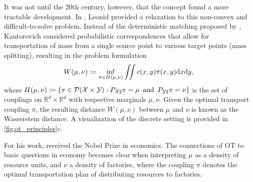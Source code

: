It was not until the 20th century, however, that the concept found a more tractable development. In \citeyear{kantorovich1942transfer}, Leonid \citeauthor{kantorovich1942transfer} provided a relaxation to this non-convex and difficult-to-solve problem.
Instead of the deterministic matching proposed by \citeauthor{monge1781histoire}, Kantorovich considered probabilistic correspondences that allow for transportation of mass from a single source point to various target points (mass splitting), resulting in the problem formulation
\begin{equation} \label{eq:kantorovich}
    W(\mu, \nu) \coloneqq \inf_{\pi\in \Pi(\mu,\nu)}\iint c(x, y) \pi(x, y)\mathrm{d}x\mathrm{d}y,
\end{equation}
where $\Pi(\mu, \nu) \coloneqq \left\{\pi \in {\mathcal{P}}(\mathcal{X} \times \mathcal{Y}): P_{{\mathcal{X}} \sharp} \pi=\mu \, \text { and } \, P_{{\mathcal{Y}} \sharp} \pi=\nu\right\}$ is the set of couplings on $\mathbb{R}^d\times\mathbb{R}^d$ with respective marginals $\mu, \nu$. Given the optimal transport coupling $\pi$, the resulting distance $W(\mu, \nu)$ between $\mu$ and $\nu$ is known as the Wasserstein distance.
A visualization of the discrete setting is provided in \cref{fig:ot_principles}c.

For his work, \citeauthor{kantorovich1942transfer} received the Nobel Prize in economics. The connections of \acrshort{OT} to basic questions in economy becomes clear when interpreting $\mu$ as a density of resource units, and $\nu$ a density of factories, where the coupling $\pi$ denotes the optimal transportation plan of distributing resources to factories.

